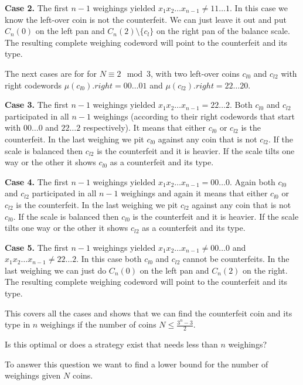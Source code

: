 \textbf{Case 2.} The first $n-1$ weighings yielded $x_1 x_2 \ldots x_{n-1} \neq 11\ldots1$. In this case we know the left-over coin is not the counterfeit. We can just leave it out and put $C_n(0)$ on the left pan and $C_n(2) \setminus \{c_l\}$ on the right pan of the balance scale. The resulting complete weighing codeword will point to the counterfeit and its type.

The next cases are for for $N \equiv 2 \mod 3$, with two left-over coins $c_{l0}$ and $c_{l2}$ with right codewords $\mu(c_{l0}).right=00\ldots01$ and $\mu(c_{l2}).right=22\ldots20$.

\textbf{Case 3.} The first $n-1$ weighings yielded $x_1 x_2 \ldots x_{n-1} = 22\ldots2$. Both $c_{l0}$ and $c_{l2}$ participated in all $n-1$ weighings (according to their right codewords that start with $00\ldots0$ and $22\ldots2$ respectively). It means that either $c_{l0}$ or $c_{l2}$ is the counterfeit.  In the last weighing we pit $c_{l0}$ against any coin that is not $c_{l2}$. If the scale is balanced then $c_{l2}$ is the counterfeit and it is heavier. If the scale tilts one way or the other it shows $c_{l0}$ as a counterfeit and its type.

\textbf{Case 4.} The first $n-1$ weighings yielded $x_1 x_2 \ldots x_{n-1} = 00\ldots0$. Again both $c_{l0}$ and $c_{l2}$ participated in all $n-1$ weighings and again it means that either $c_{l0}$ or $c_{l2}$ is the counterfeit.  In the last weighing we pit $c_{l2}$ against any coin that is not $c_{l0}$. If the scale is balanced then $c_{l0}$ is the counterfeit and it is heavier. If the scale tilts one way or the other it shows $c_{l2}$ as a counterfeit and its type.

\textbf{Case 5.} The first $n-1$ weighings yielded $x_1 x_2 \ldots x_{n-1} \neq 00\ldots0$ and $x_1 x_2 \ldots x_{n-1} \neq 22\ldots2$. In this case both $c_{l0}$ and $c_{l2}$ cannot be counterfeits. In the last weighing we can just do $C_n(0)$ on the left pan and $C_n(2)$ on the right. The resulting complete weighing codeword will point to the counterfeit and its type.

This covers all the cases and shows that we can find the counterfeit coin and its type in $n$ weighings if the number of coins $N \leq \frac{3^n - 3}{2}$. 

Is this optimal or does a strategy exist that needs less than $n$ weighings?

To answer this question we want to find a lower bound for the number of weighings given $N$ coins.  

